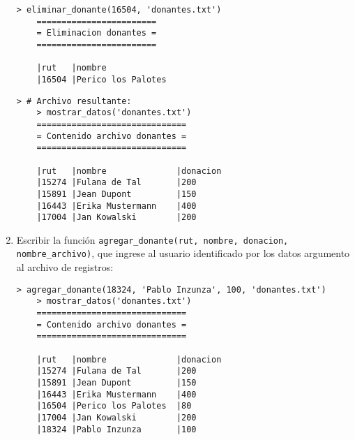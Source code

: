 \begin{enumerate}
    \begin{lstlisting}[style=consola]
    > eliminar_donante(16504, 'donantes.txt')
    ========================
    = Eliminacion donantes =
    ========================

    |rut   |nombre
    |16504 |Perico los Palotes  
    \end{lstlisting}
    
    \begin{lstlisting}[style=consola]
    > # Archivo resultante:
    > mostrar_datos('donantes.txt')
    ==============================
    = Contenido archivo donantes =
    ==============================

    |rut   |nombre              |donacion
    |15274 |Fulana de Tal       |200
    |15891 |Jean Dupont         |150
    |16443 |Erika Mustermann    |400
    |17004 |Jan Kowalski        |200
    \end{lstlisting}
  \item
    Escribir la función
    \texttt{agregar\_donante(rut, nombre, donacion, nombre\_archivo)},
    que ingrese al usuario identificado por los datos argumento
    al archivo de registros:
    
    \begin{lstlisting}[style=consola]
    > agregar_donante(18324, 'Pablo Inzunza', 100, 'donantes.txt')
    > mostrar_datos('donantes.txt')
    ==============================
    = Contenido archivo donantes =
    ==============================

    |rut   |nombre              |donacion
    |15274 |Fulana de Tal       |200
    |15891 |Jean Dupont         |150
    |16443 |Erika Mustermann    |400
    |16504 |Perico los Palotes  |80
    |17004 |Jan Kowalski        |200
    |18324 |Pablo Inzunza       |100
    \end{lstlisting}
  \end{enumerate}